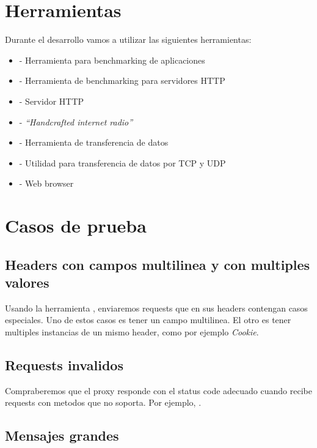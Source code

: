 \documentclass[11pt,a4paper,titlepage]{article}
\begin{document}
\section{Herramientas}
    Durante el desarrollo vamos a utilizar las siguientes herramientas:
    \begin{itemize}
        \item {} - Herramienta para benchmarking de aplicaciones
        \item {} - Herramienta de benchmarking para servidores HTTP
        \item {} - Servidor HTTP
        \item {} - \emph{``Handcrafted internet radio''}
        \item {} - Herramienta de transferencia de datos
        \item {} - Utilidad para transferencia de datos por TCP y UDP
        \item {} - Web browser
    \end{itemize}

\section{Casos de prueba}
\subsection{Headers con campos multilinea y con multiples valores}
Usando la herramienta , enviaremos requests que en sus headers contengan casos especiales.
Uno de estos casos es tener un campo multilinea.
El otro es tener multiples instancias de un mismo header, como por ejemplo \textit{Cookie}.

\subsection{Requests invalidos}
Compraberemos que el proxy responde con el status code adecuado cuando recibe requests con metodos que no soporta.
Por ejemplo, .

\subsection{Mensajes grandes}
\end{document}
